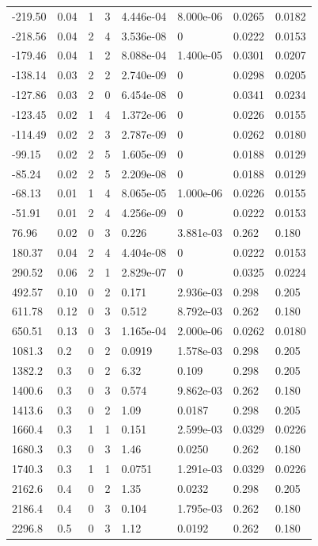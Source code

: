 \documentclass[preview]{standalone}
\begin{document}
{{\begin{tabular}{L{1.2cm}C{1.2cm} C{0.3cm}C{0.5cm} C{1.4cm}C{1.4cm} C{1.4cm}C{1.4cm}}
  -219.50  &  0.04  & 1     &  3 &  4.446e-04  & 8.000e-06  & 0.0265 &  0.0182   \\ 
  -218.56  &  0.04  & 2     &  4 &  3.536e-08  & 0  & 0.0222 &  0.0153   \\ 
  -179.46  &  0.04  & 1     &  2 &  8.088e-04  & 1.400e-05  & 0.0301 &  0.0207   \\ 
  -138.14  &  0.03  & 2     &  2 &  2.740e-09  & 0  & 0.0298 &  0.0205   \\ 
  -127.86  &  0.03  & 2     &  0 &  6.454e-08  & 0  & 0.0341 &  0.0234   \\ 
  -123.45  &  0.02  & 1     &  4 &  1.372e-06  & 0  & 0.0226 &  0.0155   \\ 
  -114.49  &  0.02  & 2     &  3 &  2.787e-09  & 0  & 0.0262 &  0.0180   \\ 
  -99.15  &  0.02  & 2     &  5 &  1.605e-09  & 0  & 0.0188 &  0.0129   \\ 
  -85.24  &  0.02  & 2     &  5 &  2.209e-08  & 0  & 0.0188 &  0.0129   \\ 
  -68.13  &  0.01  & 1     &  4 &  8.065e-05  & 1.000e-06  & 0.0226 &  0.0155   \\ 
  -51.91  &  0.01  & 2     &  4 &  4.256e-09  & 0  & 0.0222 &  0.0153   \\ 
  76.96  &  0.02  & 0     &  3 &  0.226  & 3.881e-03  & 0.262 &  0.180   \\ 
  180.37  &  0.04  & 2     &  4 &  4.404e-08  & 0  & 0.0222 &  0.0153   \\ 
  290.52  &  0.06  & 2     &  1 &  2.829e-07  & 0  & 0.0325 &  0.0224   \\ 
  492.57  &  0.10  & 0     &  2 &  0.171  & 2.936e-03  & 0.298 &  0.205   \\ 
  611.78  &  0.12  & 0     &  3 &  0.512  & 8.792e-03  & 0.262 &  0.180   \\ 
  650.51  &  0.13  & 0     &  3 &  1.165e-04  & 2.000e-06  & 0.0262 &  0.0180   \\ 
  1081.3  &   0.2  & 0     &  2 &  0.0919  & 1.578e-03  & 0.298 &  0.205   \\ 
  1382.2  &   0.3  & 0     &  2 &  6.32  & 0.109  & 0.298 &  0.205   \\ 
  1400.6  &   0.3  & 0     &  3 &  0.574  & 9.862e-03  & 0.262 &  0.180   \\ 
  1413.6  &   0.3  & 0     &  2 &  1.09  & 0.0187  & 0.298 &  0.205   \\ 
  1660.4  &   0.3  & 1     &  1 &  0.151  & 2.599e-03  & 0.0329 &  0.0226   \\ 
  1680.3  &   0.3  & 0     &  3 &  1.46  & 0.0250  & 0.262 &  0.180   \\ 
  1740.3  &   0.3  & 1     &  1 &  0.0751  & 1.291e-03  & 0.0329 &  0.0226   \\ 
  2162.6  &   0.4  & 0     &  2 &  1.35  & 0.0232  & 0.298 &  0.205   \\ 
  2186.4  &   0.4  & 0     &  3 &  0.104  & 1.795e-03  & 0.262 &  0.180   \\ 
  2296.8  &   0.5  & 0     &  3 &  1.12  & 0.0192  & 0.262 &  0.180   \\ 
\hline 
\end{tabular} 

}}
\end{document}
